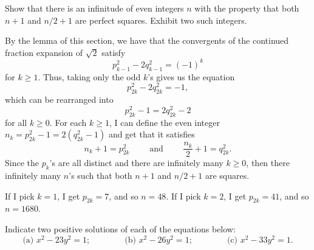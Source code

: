 \begin{exercise}
    Show that there is an infinitude of even integers $n$ with the property that both $n + 1$ and $n/2 + 1$ are perfect squares. Exhibit two such integers. \\
\end{exercise}

\begin{solution}
    By the lemma of this section, we have that the convergents of the continued fraction expansion of $\sqrt{2}$ satisfy
    $$p_{k-1}^2 - 2q_{k-1}^2 = (-1)^k$$
    for $k \geq 1$. Thus, taking only the odd $k$'s gives us the equation
    $$p_{2k}^2 - 2q_{2k}^2 = -1,$$
    which can be rearranged into
    $$p_{2k}^2 - 1 = 2q_{2k}^2 - 2$$
    for all $k \geq 0$. For each $k \geq 1$, I can define the even integer $n_k = p_{2k}^2 - 1 = 2(q_{2k}^2 - 1)$ and get that it satisfies
    $$n_k + 1 = p_{2k}^2 \qquad \text{ and } \qquad \frac{n_k}{2} + 1 = q_{2k}^2.$$
    Since the $p_k$'s are all distinct and there are infinitely many $k \geq 0$, then there infinitely many $n$'s such that both $n + 1$ and $n/2 + 1$ are squares.
    
    If I pick $k = 1$, I get $p_{2k} = 7$, and so $n = 48$. If I pick $k = 2$, I get $p_{2k} = 41$, and so $n = 1680$.\\
\end{solution}

\begin{exercise}
    Indicate two positive solutions of each of the equations below:
    $$\text{(a) } x^2 - 23y^2 = 1; \qquad \qquad \text{(b) } x^2 - 26y^2 = 1; \qquad \qquad \text{(c) } x^2 - 33y^2 = 1.$$
\end{exercise}

